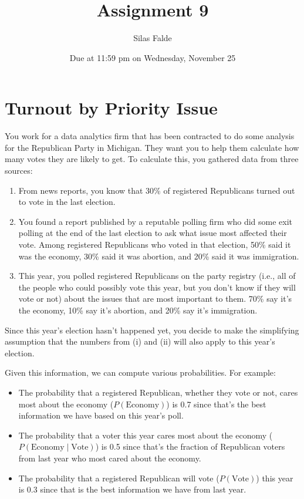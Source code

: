 \documentclass[newpages]{assignment}
\title{Assignment 9}
\author{Silas Falde}
\date{Due at 11:59 pm on Wednesday, November 25}
\begin{document}
\maketitle

\tableofcontents

\section{Turnout by Priority Issue}

\begin{problem}
    You work for a data analytics firm that has been contracted to do some analysis for the Republican Party in Michigan. They want you to help them calculate how many votes they are likely to get. To calculate this, you gathered data from three sources:
    \begin{enumerate}[label=\roman*.]
        \item From news reports, you know that 30\% of registered Republicans turned out to vote in the last election.
        \item You found a report published by a reputable polling firm who did some exit polling at the end of the last election to ask what issue most affected their vote. Among registered Republicans who voted in that election, 50\% said it was the economy, 30\% said it was abortion, and 20\% said it was immigration.
        \item This year, you polled registered Republicans on the party registry (i.e., all of the people who could possibly vote this year, but you don't know if they will vote or not) about the issues that are most important to them. 70\% say it's the economy, 10\% say it's abortion, and 20\% say it's immigration.
    \end{enumerate}

    Since this year's election hasn't happened yet, you decide to make the simplifying assumption that the numbers from (i) and (ii) will also apply to this year's election.

    Given this information, we can compute various probabilities. For example:
    \begin{itemize}
        \item The probability that a registered Republican, whether they vote or not, cares most about the economy ($P(\text{Economy})$) is 0.7 since that's the best information we have based on this year's poll.
        \item The probability that a voter this year cares most about the economy ($P(\text{Economy}\mid\text{Vote})$) is 0.5 since that's the fraction of Republican voters from last year who most cared about the economy.
        \item The probability that a registered Republican will vote ($P(\text{Vote})$) this year is 0.3 since that is the best information we have from last year.
    \end{itemize}
\end{problem}
\end{document}
